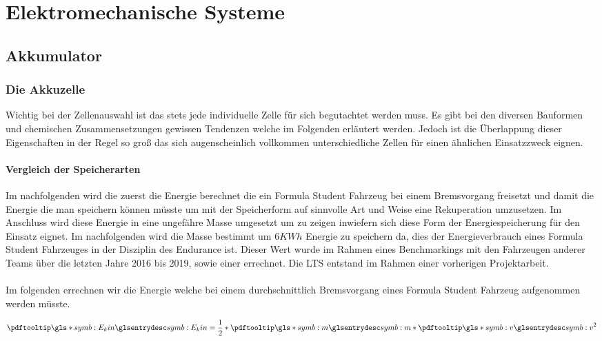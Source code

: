 
\chapter{Elektromechanische Systeme}

\section{Akkumulator}

\subsection{Die Akkuzelle}

Wichtig bei der Zellenauswahl ist das stets jede individuelle Zelle für sich begutachtet werden muss. Es gibt bei den diversen Bauformen und chemischen Zusammensetzungen gewissen Tendenzen welche im Folgenden erläutert werden. Jedoch ist die Überlappung dieser Eigenschaften in der Regel so groß das sich augenscheinlich vollkommen unterschiedliche Zellen für einen ähnlichen Einsatzzweck eignen.
\FloatBarrier
\subsubsection{Vergleich der Speicherarten}

Im nachfolgenden wird die zuerst die Energie berechnet die ein Formula Student Fahrzeug bei einem Bremsvorgang freisetzt und damit die Energie die man speichern können müsste um mit der Speicherform auf sinnvolle Art und Weise eine Rekuperation umzusetzen. Im Anschluss wird diese Energie in eine ungefähre Masse umgesetzt um zu zeigen inwiefern sich diese Form der Energiespeicherung für den Einsatz eignet. Im nachfolgenden wird die Masse bestimmt um \ensuremath{6 KWh} Energie zu speichern da, dies der Energieverbrauch eines Formula Student Fahrzeuges in der Disziplin des Endurance ist. Dieser Wert wurde im Rahmen eines Benchmarkings mit den Fahrzeugen anderer Teams über die letzten Jahre 2016 bis 2019, sowie einer  errechnet. Die \ac{LTS} entstand im Rahmen einer vorherigen Projektarbeit. \cite{DeeDor2022}
\\
\\
Im folgenden errechnen wir die Energie welche bei einem durchschnittlich Bremsvorgang eines Formula Student Fahrzeug aufgenommen werden müsste. 

\begin{equation}
\glsc{symb:E_kin} = \dfrac{1}{2} * \glsc{symb:m} * \glsc{symb:v}^2
\end{equation}

